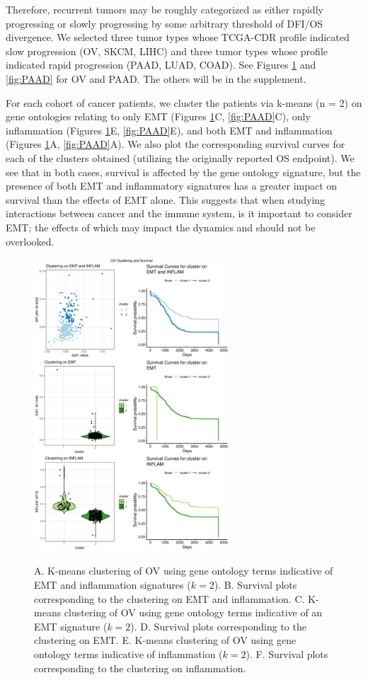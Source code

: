 \documentclass[11pt]{article}
\begin{document}
Therefore, recurrent tumors may be roughly categorized as either rapidly progressing or slowly progressing by some arbitrary threshold of DFI/OS divergence.
We selected three tumor types whose TCGA-CDR profile indicated slow progression (OV, SKCM, LIHC) and three tumor types whose profile indicated rapid progression (PAAD, LUAD, COAD).
See Figures \ref{fig:OV} and \ref{fig:PAAD} for OV and PAAD. The others will be in the supplement.
\par
For each cohort of cancer patients, we cluster the patients via k-means (n = 2) on gene ontologies relating to only EMT (Figures \ref{fig:OV}C, \ref{fig:PAAD}C), only inflammation (Figures \ref{fig:OV}E, \ref{fig:PAAD}E), and both EMT and inflammation (Figures \ref{fig:OV}A, \ref{fig:PAAD}A).
We also plot the corresponding survival curves for each of the clusters obtained (utilizing the originally reported OS endpoint).
We see that in both cases, survival is affected by the gene ontology signature, but the presence of both EMT and inflammatory signatures has a greater impact on survival than the effects of EMT alone.
This suggests that when studying interactions between cancer and the immune system, is it important to consider EMT; the effects of which may impact the dynamics and should not be overlooked. 

\begin{figure}
\center
{\includegraphics[width=0.65\textwidth]{Figure6/OV.pdf}}
\caption{A. K-means clustering of OV using gene ontology terms indicative of EMT and inflammation signatures ($k=2$).
B. Survival plots corresponding to the clustering on EMT and inflammation.
C. K-means clustering of OV using gene ontology terms indicative of an EMT signature ($k=2$).
D. Survival plots corresponding to the clustering on EMT.
E. K-means clustering of OV using gene ontology terms indicative of inflammation ($k=2$).
F. Survival plots corresponding to the clustering on inflammation.}
\label{fig:OV}
\end{figure}
\end{document}
